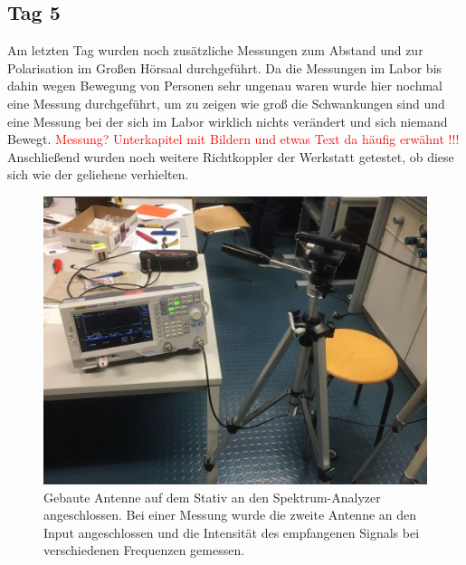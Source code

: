 \documentclass[titlepage,11pt,a4paper,ngerman]{article}
\begin{document}
\subsection{Tag 5}

Am letzten Tag wurden noch zusätzliche Messungen zum Abstand und zur Polarisation im Großen Hörsaal durchgeführt. Da die Messungen im Labor bis dahin wegen Bewegung von Personen sehr ungenau waren wurde hier nochmal eine Messung durchgeführt, um zu zeigen wie groß die Schwankungen sind und eine Messung bei der sich im Labor wirklich nichts verändert und sich niemand Bewegt. \textcolor{red}{Messung? Unterkapitel mit Bildern und etwas Text da häufig erwähnt !!!}
Anschließend wurden noch weitere Richtkoppler der Werkstatt getestet, ob diese sich wie der geliehene verhielten.
\begin{figure}[ht]
	\centering
	\includegraphics[scale=0.35, trim={0cm 8cm 3cm 2cm}, clip]{Bilder/Ant_Fktgen}
	\caption{Gebaute Antenne auf dem Stativ an den Spektrum-Analyzer angeschlossen. Bei einer Messung wurde die zweite Antenne an den Input angeschlossen und die Intensität des empfangenen Signals bei verschiedenen Frequenzen gemessen.}
	\label{ersteMessung}
\end{figure}
\end{document}
